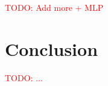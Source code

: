 \documentclass[a4paper]{article}
\newcommand\todo[1]{\textcolor{red}{TODO: #1}}
\begin{document}
\todo{Add more + MLP}




\section{Conclusion}
\todo{...}


\appendix
\setlength{\voffset}{0cm}
\setlength{\hoffset}{0cm}

% 

\setlength{\voffset}{-2.54cm}
\setlength{\hoffset}{-2.54cm}

\end{document}
